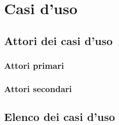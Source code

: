 \section{Casi d'uso}

\subsection{Attori dei casi d'uso}

\subsubsection{Attori primari}

\subsubsection{Attori secondari}

\subsection{Elenco dei casi d'uso}
